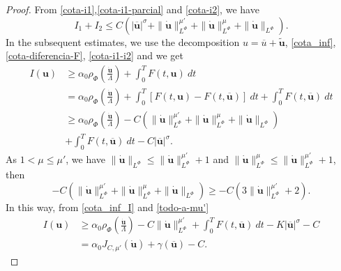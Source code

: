 \documentclass[twoside]{article}
\theoremstyle{remark}
\newcommand{\orlnor}{\|_{L^{\Phi}}}
\renewcommand{\b}[1]{\boldsymbol{#1}}
\renewcommand{\leq}{\leqslant}
\begin{document}
\begin{proof}
From \eqref{cota-i1},\eqref{cota-i1-parcial} and \eqref{cota-i2}, we have
\begin{equation}\label{cota-i1-i2}
I_1+I_2
\leq C( |\b{\overline{u}}|^{\sigma}
+ \|\b{\dot u}\orlnor^{\mu'}
+ \|\b{\dot u}\orlnor^{\mu}
+\|\b{\dot u}\orlnor) .
\end{equation}
In the subsequent estimates, we use the decomposition $u=\overline{u}+\b{\tilde{u}}$, \eqref{cota_inf}, \eqref{cota-diferencia-F},
\eqref{cota-i1-i2} and we get
\begin{equation}\label{cota_inf_I}
\begin{split}
I(\b{u})&\geq\alpha_0\rho_{\Phi}\left( \frac{\b{\dot{u}}}{\Lambda}\right)+\int_0^TF(t,\b{u})\ dt
\\ 
&=\alpha_0\rho_{\Phi}\left( \frac{\b{\dot{u}}}{\Lambda}\right)+ \int_0^T \left[F(t,\b{u})-F(t,\b{\overline{u}})\right]\ dt 
+  \int_0^TF(t,\b{\overline{u}})\ dt
\\
&\geq \alpha_0\rho_{\Phi}\left( \frac{\b{\dot{u}}}{\Lambda}\right)
-C( \|\b{\dot u}\orlnor^{\mu'}
+ \|\b{\dot u}\orlnor^{\mu}
+ \|\b{\dot u}\orlnor)
\\
&+\int_0^TF(t,\b{\overline{u}})\ dt-
C |\b{\overline{u}}|^{\sigma}.
\end{split}
\end{equation}
As $1<\mu\leq \mu'$, we have  
$\|\b{\dot u}\orlnor \le\|\b{\dot u}\orlnor^{\mu'}+1$ and
$\|\b{\dot u}\orlnor^{\mu}\le\|\b{\dot u}\orlnor^{\mu'}+1$, then
\begin{equation}\label{todo-a-mu'}
-C( \|\b{\dot u}\orlnor^{\mu'}
+ \|\b{\dot u}\orlnor^{\mu}
+ \|\b{\dot u}\orlnor)
\geq
-C(3\|\b{\dot u}\orlnor^{\mu'}+2).
\end{equation}
In this way, from \eqref{cota_inf_I} and \eqref{todo-a-mu'}
\[
\begin{split}
I(\b{u})
&\geq\alpha_0\rho_{\Phi}\left( \frac{\b{\dot{u}}}{\Lambda}\right)
-C\|\b{\dot u}\orlnor^{\mu'}
+\int_0^TF(t,\b{\overline{u}})\ dt-K|\b{\overline{u}}|^{\sigma}
-C
\\
&=\alpha_0J_{C,\mu'}(\b{\dot u})
+ \gamma(\b{\overline{u}})-C.
\end{split}
\]





\end{proof}
\end{document}

